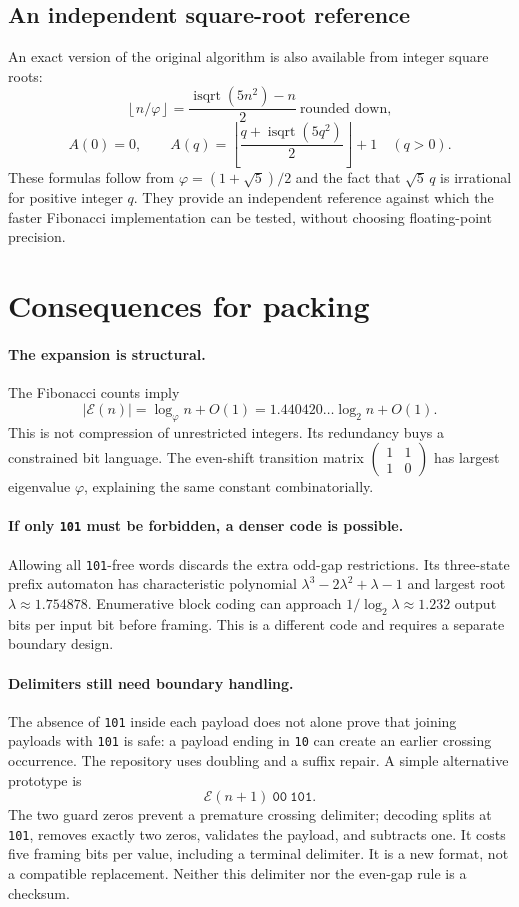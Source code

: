 \documentclass[11pt]{article}
\theoremstyle{definition}\newtheorem{definition}[theorem]{Definition}
\newcommand{\ph}{\varphi}
\newcommand{\fl}[1]{\left\lfloor #1\right\rfloor}
\newcommand{\E}{\mathcal E}
\begin{document}
\subsection{An independent square-root reference}
An exact version of the original algorithm is also available from
integer square roots:
\[
\fl{n/\ph}=\frac{\operatorname{isqrt}(5n^2)-n}{2}\ \text{rounded down},
\]
\[
A(0)=0,\qquad
A(q)=\fl{\frac{q+\operatorname{isqrt}(5q^2)}{2}}+1\quad(q>0).
\]
These formulas follow from $\ph=(1+\sqrt5)/2$ and the fact that
$\sqrt5\,q$ is irrational for positive integer $q$. They provide an
independent reference against which the faster Fibonacci implementation
can be tested, without choosing floating-point precision.

\section{Consequences for packing}
\paragraph{The expansion is structural.}
The Fibonacci counts imply
\[
|\E(n)|=\log_\ph n+O(1)
=1.440420\ldots\log_2n+O(1).
\]
This is not compression of unrestricted integers. Its redundancy buys
a constrained bit language. The even-shift transition matrix
$\left(\begin{smallmatrix}1&1\\1&0\end{smallmatrix}\right)$ has
largest eigenvalue $\ph$, explaining the same constant combinatorially.

\paragraph{If only \texttt{101} must be forbidden, a denser code is possible.}
Allowing all \texttt{101}-free words discards the extra odd-gap
restrictions. Its three-state prefix automaton has characteristic
polynomial $\lambda^3-2\lambda^2+\lambda-1$ and largest root
$\lambda\approx1.754878$. Enumerative block coding can approach
$1/\log_2\lambda\approx1.232$ output bits per input bit before framing.
This is a different code and requires a separate boundary design.

\paragraph{Delimiters still need boundary handling.}
The absence of \texttt{101} inside each payload does not alone prove that
joining payloads with \texttt{101} is safe: a payload ending in
\texttt{10} can create an earlier crossing occurrence. The repository
uses doubling and a suffix repair. A simple alternative prototype is
\[
\E(n+1)\ \texttt{00}\ \texttt{101}.
\]
The two guard zeros prevent a premature crossing delimiter; decoding
splits at \texttt{101}, removes exactly two zeros, validates the payload,
and subtracts one. It costs five framing bits per value, including a
terminal delimiter. It is a new format, not a compatible replacement.
Neither this delimiter nor the even-gap rule is a checksum.
\end{document}
